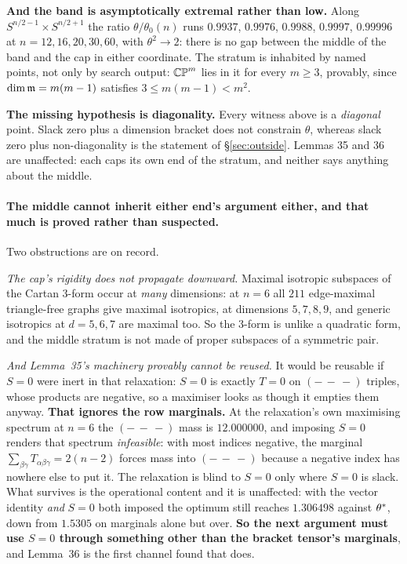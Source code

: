 \textbf{And the band is asymptotically extremal rather than low.} Along $S^{n/2-1}\times S^{n/2+1}$ the ratio $\theta/\theta_0(n)$ runs $0.9937$, $0.9976$, $0.9988$, $0.9997$, $0.99996$ at $n=12,16,20,30,60$, with $\theta^2\to2$: there is no gap between the middle of the band and the cap in either coordinate. The stratum is inhabited by named points, not only by search output: $\mathbb{CP}^m$ lies in it for every $m\ge3$, provably, since $\dim\mathfrak{m}=m(m-1)$ satisfies $3\le m(m-1)<m^2$.

\textbf{The missing hypothesis is diagonality.} Every witness above is a \emph{diagonal} point. Slack zero plus a dimension bracket does not constrain $\theta$, whereas slack zero plus non-diagonality is the statement of \S\ref{sec:outside}. Lemmas 35 and 36 are unaffected: each caps its own end of the stratum, and neither says anything about the middle.

\paragraph{The middle cannot inherit either end's argument either, and that much is proved rather than suspected.} Two obstructions are on record.

\emph{The cap's rigidity does not propagate downward.} Maximal isotropic subspaces of the Cartan $3$-form occur at \emph{many} dimensions: at $n=6$ all $211$ edge-maximal triangle-free graphs give maximal isotropics, at dimensions $5,7,8,9$, and generic isotropics at $d=5,6,7$ are maximal too. So the $3$-form is unlike a quadratic form, and the middle stratum is not made of proper subspaces of a symmetric pair.

\emph{And Lemma~35's machinery provably cannot be reused.} It would be reusable if $S=0$ were inert in that relaxation: $S=0$ is exactly $T=0$ on $(-\,-\,-)$ triples, whose products are negative, so a maximiser looks as though it empties them anyway. \textbf{That ignores the row marginals.} At the relaxation's own maximising spectrum at $n=6$ the $(-\,-\,-)$ mass is $12.000000$, and imposing $S=0$ renders that spectrum \emph{infeasible}: with most indices negative, the marginal $\sum_{\beta\gamma}T_{\alpha\beta\gamma}=2(n-2)$ forces mass into $(-\,-\,-)$ because a negative index has nowhere else to put it. The relaxation is blind to $S=0$ only where $S=0$ is slack. What survives is the operational content and it is unaffected: with the vector identity \emph{and} $S=0$ both imposed the optimum still reaches $1.306498$ against $\theta^{*}$, down from $1.5305$ on marginals alone but over. \textbf{So the next argument must use $S=0$ through something other than the bracket tensor's marginals}, and Lemma~36 is the first channel found that does.

